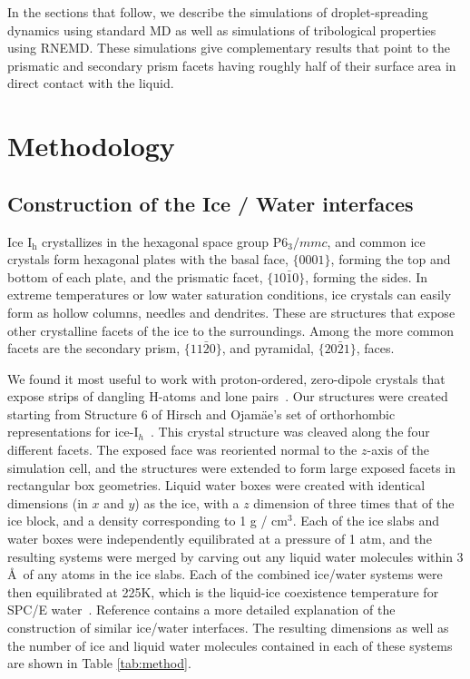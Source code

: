 \documentclass[aps,jcp,preprint,showpacs,superscriptaddress,groupedaddress]{revtex4}  %
\begin{document}
In the sections that follow, we describe the simulations of
droplet-spreading dynamics using standard MD as well as simulations of
tribological properties using RNEMD.  These simulations give
complementary results that point to the prismatic and secondary prism
facets having roughly half of their surface area in direct contact
with the liquid.

\section{Methodology}
\subsection{Construction of the Ice / Water interfaces}
Ice I$_\mathrm{h}$ crystallizes in the hexagonal space group
P$6_3/mmc$, and common ice crystals form hexagonal plates with the
basal face, $\{0001\}$, forming the top and bottom of each plate, and
the prismatic facet, $\{10\bar{1}0\}$, forming the sides.  In extreme
temperatures or low water saturation conditions, ice crystals can
easily form as hollow columns, needles and dendrites. These are
structures that expose other crystalline facets of the ice to the
surroundings.  Among the more common facets are the secondary prism,
$\{11\bar{2}0\}$, and pyramidal, $\{20\bar{2}1\}$, faces.  

We found it most useful to work with proton-ordered, zero-dipole
crystals that expose strips of dangling H-atoms and lone
pairs~\cite{Buch:2008fk}.  Our structures were created starting from
Structure 6 of Hirsch and Ojam\"{a}e's set of orthorhombic
representations for ice-I$_{h}$~\cite{Hirsch04}.  This crystal
structure was cleaved along the four different facets.  The exposed
face was reoriented normal to the $z$-axis of the simulation cell, and
the structures were extended to form large exposed facets in
rectangular box geometries.  Liquid water boxes were created with
identical dimensions (in $x$ and $y$) as the ice, with a $z$ dimension
of three times that of the ice block, and a density corresponding to 1
g / cm$^3$.  Each of the ice slabs and water boxes were independently
equilibrated at a pressure of 1 atm, and the resulting systems were
merged by carving out any liquid water molecules within 3 \AA\ of any
atoms in the ice slabs.  Each of the combined ice/water systems were
then equilibrated at 225K, which is the liquid-ice coexistence
temperature for SPC/E water~\cite{Bryk02}. Reference
\citealp{Louden13} contains a more detailed explanation of the
construction of similar ice/water interfaces. The resulting dimensions
as well as the number of ice and liquid water molecules contained in
each of these systems are shown in Table \ref{tab:method}.
\end{document}
